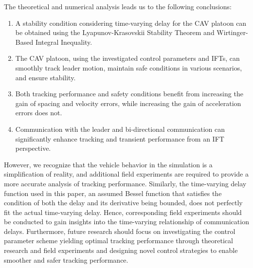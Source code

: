 \documentclass[journal]{IEEEtran}
\begin{document}
The theoretical and numerical analysis leads us to the following conclusions:
\begin{enumerate}
\item A stability condition considering time-varying delay for the CAV platoon can be obtained using the Lyapunov-Krasovskii Stability Theorem and Wirtinger-Based Integral Inequality.
\item The CAV platoon, using the investigated control parameters and IFTs, can smoothly track leader motion, maintain safe conditions in various scenarios, and ensure stability.
\item Both tracking performance and safety conditions benefit from increasing the gain of spacing and velocity errors, while increasing the gain of acceleration errors does not.
\item Communication with the leader and bi-directional communication can significantly enhance tracking and transient performance from an IFT perspective.
\end{enumerate}

However, we recognize that the vehicle behavior in the simulation is a simplification of reality, and additional field experiments are required to provide a more accurate analysis of tracking performance. Similarly, the time-varying delay function used in this paper, an assumed Bessel function that satisfies the condition of both the delay and its derivative being bounded, does not perfectly fit the actual time-varying delay. Hence, corresponding field experiments should be conducted to gain insights into the time-varying relationship of communication delays. Furthermore, future research should focus on investigating the control parameter scheme yielding optimal tracking performance through theoretical research and field experiments and designing novel control strategies to enable smoother and safer tracking performance.

\appendix
\end{document}
